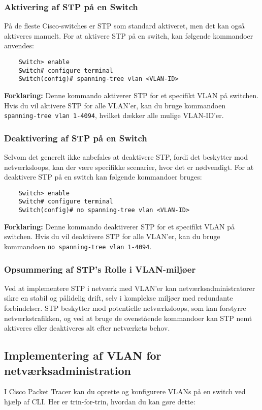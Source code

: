 \subsubsection{Aktivering af STP på en Switch}
På de fleste Cisco-switches er STP som standard aktiveret, men det kan også aktiveres manuelt. For at aktivere STP på en switch, kan følgende kommandoer anvendes:

\begin{verbatim}
	Switch> enable
	Switch# configure terminal
	Switch(config)# spanning-tree vlan <VLAN-ID>
\end{verbatim}
\noindent \textbf{Forklaring:} Denne kommando aktiverer STP for et specifikt VLAN på switchen. Hvis du vil aktivere STP for alle VLAN'er, kan du bruge kommandoen \texttt{spanning-tree vlan 1-4094}, hvilket dækker alle mulige VLAN-ID'er.

\subsubsection{Deaktivering af STP på en Switch}
Selvom det generelt ikke anbefales at deaktivere STP, fordi det beskytter mod netværksloops, kan der være specifikke scenarier, hvor det er nødvendigt. For at deaktivere STP på en switch kan følgende kommandoer bruges:
\begin{verbatim}
	Switch> enable
	Switch# configure terminal
	Switch(config)# no spanning-tree vlan <VLAN-ID>
\end{verbatim}

\noindent \textbf{Forklaring:} Denne kommando deaktiverer STP for et specifikt VLAN på switchen. Hvis du vil deaktivere STP for alle VLAN'er, kan du bruge kommandoen \texttt{no spanning-tree vlan 1-4094}.

\subsubsection{Opsummering af STP's Rolle i VLAN-miljøer}
Ved at implementere STP i netværk med VLAN'er kan netværksadministratorer sikre en stabil og pålidelig drift, selv i komplekse miljøer med redundante forbindelser. STP beskytter mod potentielle netværksloops, som kan forstyrre netværkstrafikken, og ved at bruge de ovenstående kommandoer kan STP nemt aktiveres eller deaktiveres alt efter netværkets behov.


\subsection{Implementering af VLAN for netværksadministration}
I Cisco Packet Tracer kan du oprette og konfigurere VLANs på en switch ved hjælp af CLI. Her er trin-for-trin, hvordan du kan gøre dette:


